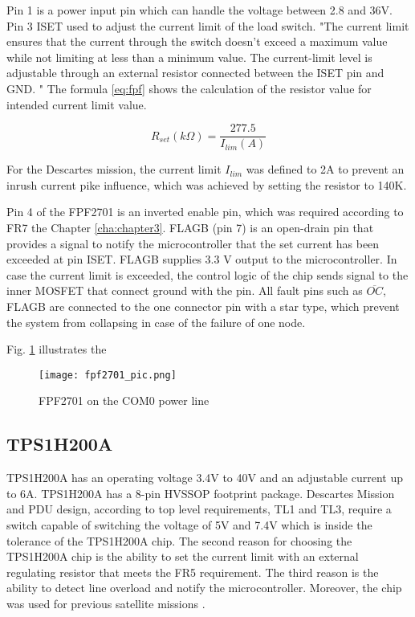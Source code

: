 Pin 1 is a power input pin which can handle the voltage between 2.8 and 36V. Pin 3 ISET used to adjust the current limit of the load switch. \cite{27} "The  current  limit  ensures  that  the  current  through  the switch  doesn't  exceed  a  maximum  value  while  not limiting  at  less  than  a  minimum  value.  The current-limit level    is    adjustable    through    an    external    resistor connected between the ISET pin and GND. " The formula \ref{eq:fpf} shows the calculation of the resistor value for intended current limit value.

\begin{equation}\label{eq:fpf}
R_{set}(k\Omega) = \frac{277.5}{I_{lim}(A)}
\end{equation}

For the Descartes mission, the current limit $I_{lim}$ was defined to 2A to prevent an inrush current pike influence, which was achieved by setting the resistor to 140K.

Pin 4 of the FPF2701 is an inverted enable pin, which was required according to FR7 the Chapter \ref{cha:chapter3}. FLAGB (pin 7) is an open-drain pin that provides a signal to notify the microcontroller that the set current has been exceeded at pin ISET. FLAGB supplies 3.3 V output to the microcontroller. In case the current limit is exceeded, the control logic of the chip sends signal to the inner MOSFET that connect ground with the pin. All fault pins such as $\overline{OC}$, FLAGB  are connected to the one connector pin with a star type, which prevent the system from collapsing in case of the failure of one node.

Fig. \ref{fig: fpf27_schema} illustrates the 

\begin{figure}[h]
	\centering
	\texttt{[image: fpf2701\_pic.png]}
	\caption{FPF2701 on the COM0 power line}
	\label{fig: fpf27_schema}
\end{figure} 

\subsection{TPS1H200A}

TPS1H200A has an operating voltage 3.4V to 40V and an adjustable current up to 6A. TPS1H200A has a 8-pin HVSSOP footprint package. Descartes Mission and PDU design, according to top level requirements, TL1 and TL3, require a switch capable of switching the voltage of 5V and 7.4V which is inside the tolerance of the TPS1H200A chip. The second reason for choosing the TPS1H200A chip is the ability to set the current limit with an external regulating resistor that meets the FR5 requirement. The third reason is the ability to detect line overload and notify the microcontroller. Moreover, the chip was used for previous satellite missions \cite{28}.\\

